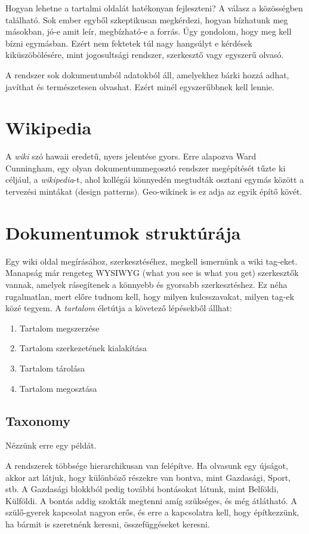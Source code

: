 	Hogyan lehetne a tartalmi oldalát hatékonyan fejleszteni? A válasz a közösségben található. Sok ember egyből szkeptikusan megkérdezi, hogyan bízhatunk meg másokban, jó-e amit leír, megbízható-e a forrás. Úgy gondolom, hogy meg kell bízni egymásban. Ezért nem fektetek túl nagy hangsúlyt e kérdések kiküszöbölésére,
	mint jogosultsági rendszer, szerkesztő vagy egyszerű olvasó. 

	A rendszer sok dokumentumból adatokból áll, amelyekhez bárki hozzá adhat, javíthat és természetesen olvashat. Ezért minél egyszerűbbnek kell lennie.
	\section{Wikipedia} A \emph{wiki} szó hawaii eredetű, nyers jelentése gyors. Erre alapozva Ward Cunningham, egy olyan dokumentummegosztó rendszer megépítését tűzte ki céljául, a \emph{wikipedia}-t, ahol  kollégái könnyedén megtudták osztani egymás között a tervezési mintákat (design patterns). Geo-wikinek is ez adja az egyik építő kövét.

\section{Dokumentumok struktúrája}
	Egy wiki oldal megírásához, szerkesztéséhez, megkell ismernünk a wiki tag-eket. Manapság már rengeteg WYSIWYG (what you see is what you get) szerkesztők vannak, amelyek rásegítenek a könnyebb és gyorsabb szerkesztéshez. Ez néha rugalmatlan, mert előre tudnom kell, hogy milyen kulcsszavakat, milyen tag-ek közé tegyem.
	A \emph{tartalom} életútja a követező lépésekből állhat:
	\begin{enumerate}
		\item Tartalom megszerzése
		\item Tartalom szerkezetének kialakítása
		\item Tartalom tárolása
		\item Tartalom megosztása
	\end{enumerate}

	\subsection{Taxonomy} Nézzünk erre egy példát.

	A rendszerek többsége hierarchikusan van felépítve. Ha olvasunk egy újságot, akkor azt látjuk, hogy különböző részekre van bontva, mint Gazdasági, Sport, stb. A Gazdasági blokkból pedig további bontásokat látunk, mint Belföldi, Külföldi. A bontás addig szokták megtenni amíg szükséges, és még átlátható. A szülő-gyerek kapcsolat nagyon erős, és erre a kapcsolatra kell, hogy építkezzünk, ha bármit is szeretnénk keresni, összefüggéseket keresni.

